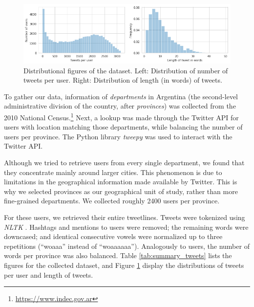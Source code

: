 \begin{figure}[h]
    \centering
    \includegraphics[width=\textwidth]{./images/dataset_histograms.png}
    \caption{Distributional figures of the dataset. Left: Distribution of number of tweets per user. Right: Distribution of length (in words) of tweets.} 
    \label{fig:tweets_distribution} 
 \end{figure}

To gather our data, information of \textit{departments} in Argentina (the second-level administrative division of the country, after \textit{provinces}) was collected from the 2010 National Census.\footnote{\url{https://www.indec.gov.ar}} Next, a lookup was made through the Twitter API for users with location matching those departments, while balancing the number of users per province. The Python library \textit{tweepy} was used to interact with the Twitter API. 

Although we tried to retrieve users from every single department, we found that they concentrate mainly around larger cities. This phenomenon is due to limitations in the geographical information made available by Twitter. This is why we selected provinces as our geographical unit of study, rather than more fine-grained departments. We collected roughly 2400 users per province.

For these users, we retrieved their entire tweetlines. Tweets were tokenized using \emph{NLTK} \cite{bird2009natural}. Hashtags and mentions to users were removed; the remaining words were downcased; and identical consecutive vowels were normalized up to three repetitions (``woaaa'' instead of ``woaaaaaa''). Analogously to users, the number of words per province was also balanced. Table \ref{tab:summary_tweets} lists the figures for the collected dataset, and Figure \ref{fig:tweets_distribution} display the distributions of tweets per user and length of tweets.

